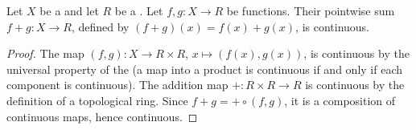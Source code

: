 \begin{proposition} \label{proposition:pointwise_sum_of_continuous_functions_on_topological_spaces_valued_in_topological_ring_is_continuous}
    Let $X$ be a  and let $R$ be a . Let $f,g : X \to R$ be  functions. Their pointwise sum $f+g : X \to R$, defined by $(f+g)(x) = f(x) + g(x)$, is continuous.
\end{proposition}
\begin{proof}
    The map $(f,g) : X \to R \times R$, $x \mapsto (f(x), g(x))$, is continuous by the universal property of the  (a map into a product is continuous if and only if each component is continuous). The addition map $+ : R \times R \to R$ is continuous by the definition of a topological ring. Since $f+g = + \circ (f,g)$, it is a composition of continuous maps, hence continuous.
\end{proof}